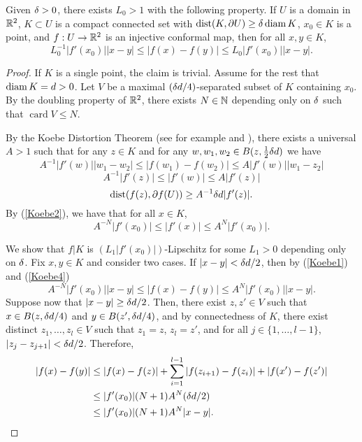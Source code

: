 \documentclass{amsart}
\DeclareMathOperator{\dist}{dist}
\DeclareMathOperator{\card}{card}
\begin{document}
\begin{lemma}
\label{lem:koebe}
Given $\delta>0$, there exists $L_0>1$ with the following property. If $U$ is a domain in $\mathbb{R}^2$, $K \subset U$ is a compact connected set with $\dist(K,\partial U) \geq \d \diam{K}$, $x_0\in K$ is a point, and $f:U \to \mathbb{R}^2$ is an injective conformal map, then for all $x,y \in K$,
\[ L_0^{-1}|f'(x_0)| |x-y|  \leq |f(x)-f(y)| \leq L_0|f'(x_0)| |x-y|.\]
\end{lemma}

\begin{proof}
If $K$ is a single point, the claim is trivial. Assume for the rest that $\operatorname{diam}{K} = d>0$. Let $V$ be a maximal $(\delta d/4)$-separated subset of $K$ containing $x_0$. By the doubling property of $\mathbb{R}^2$, there exists $N\in\mathbb{N}$ depending only on $\delta$ such that $\card{V} \leq N$. 

By the Koebe Distortion Theorem (see for example \cite[Theorem I.4.5]{GM} and \cite[Theorem 1.3]{Pomm}), there exists a universal $A>1$ such that for any $z\in K$ and for any $w,w_1,w_2\in B(z,\frac12\delta d)$ we have
\begin{equation}\label{Koebe1}
A^{-1}|f'(w)| |w_1-w_2| \leq |f(w_1)-f(w_2)| \leq A|f'(w)| |w_1-z_2|
\end{equation}
\begin{equation}\label{Koebe2}
A^{-1}|f'(z)| \leq |f'(w)| \leq A |f'(z)|
\end{equation}
\begin{equation}\label{Koebe3}
\dist(f(z),\partial f(U)) \geq A^{-1} \d d |f'(z)|.
\end{equation}
By (\ref{Koebe2}), we have that for all $x\in K$, 
\begin{equation}\label{Koebe4}
A^{-N}|f'(x_0)| \leq |f'(x)| \leq A^N |f'(x_0)|.
\end{equation}

We show that $f|K$ is $(L_1|f'(x_0)|)$-Lipschitz for some $L_1>0$ depending only on $\delta$. Fix $x,y \in K$ and consider two cases. If $|x-y|<\delta d/2$, then by (\ref{Koebe1}) and (\ref{Koebe4})
\[ A^{-N}|f'(x_0)| |x-y|  \leq |f(x)-f(y)| \leq A^{N}|f'(x_0)| |x-y|.\]
Suppose now that $|x-y|\geq \delta d/2$. Then, there exist $z,z'\in V$ such that $x\in B(z,\delta d/4)$ and $y\in B(z',\delta d/4)$, and by connectedness of $K$, there exist distinct $z_1,\dots,z_l \in V$ such that $z_1=z$, $z_l =z'$, and for all $j\in\{1,\dots,l-1\}$, $|z_j-z_{j+1}| < \delta d/2$. Therefore,
\begin{align*}
|f(x)-f(y)| &\leq |f(x)-f(z)| + \sum_{i=1}^{l-1}|f(z_{i+1})-f(z_i)| + |f(x')-f(z')|\\ 
&\leq |f'(x_0)|(N+1)A^N (\delta d/2)\\ 
&\leq |f'(x_0)|(N+1)A^N |x-y|.
\end{align*}


\end{proof}
\end{document}
